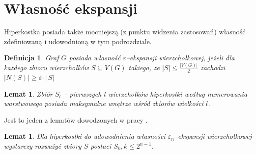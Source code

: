 \documentclass{pracamgr}
\newtheorem{defi}[theorem]{Definicja}
\newtheorem{lemma}[theorem]{Lemat}
\begin{document}
  \section{Własność ekspansji}
   Hiperkostka posiada także mocniejszą (z punktu widzenia zastosowań) własność zdefiniowaną i udowodnioną w tym podrozdziale.
   \begin{defi}\label{epsilon ekspansja wierzcholkowa}
    Graf $G$ posiada własność \emph{$\varepsilon$--ekspansji wierzchołkowej}, jeżeli dla każdego zbioru wierzchołków $S\subseteq V(G)$ takiego,
    że $|S|\le\frac{|V(G)|}{2}$ zachodzi $|N(S)|\ge\varepsilon\cdot|S|$
   \end{defi}
   \begin{lemma}\label{HAR1}
    Zbiór $S_l$ -- pierwszych $l$ wierzchołków hiperkostki według numerowania warstwowego posiada maksymalne wnętrze wśród zbiorów wielkości $l$.  
   \end{lemma}
   Jest to jeden z lematów dowodzonych w pracy \cite{HAR}.
   \begin{lemma}\label{S->S_k}
    Dla hiperkostki do udowodnienia własności $\varepsilon_n$--ekspansji wierzchołkowej wystarczy rozważyć zbiory $S$ postaci $S_k,k\le 2^{n-1}$.
   \end{lemma}
\end{document}
